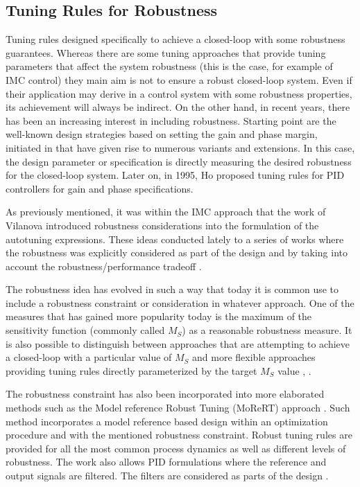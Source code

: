 \subsection{Tuning Rules for Robustness}

Tuning rules designed specifically to achieve a closed-loop with some robustness guarantees. Whereas there are some tuning approaches that provide tuning parameters that  affect the system robustness (this is the case, for example of IMC control) they main aim is not to ensure a robust closed-loop system. Even if their application may derive in a control system with some robustness properties, its achievement will always be indirect. On the other hand, in recent years, there has been an increasing interest in including robustness. Starting point are the well-known design strategies based on setting the gain and phase margin, initiated in \cite{astromhagglun84} that have given rise to numerous variants and extensions. In this case, the design parameter or specification is directly measuring the desired robustness for the closed-loop system. Later on, in 1995, Ho \cite{hoetal95} proposed tuning rules for PID controllers for gain and phase specifications.

As previously mentioned, it was within the IMC approach that the work of Vilanova \cite{vilanovaJPC2008} introduced robustness considerations into the formulation of the autotuning  expressions. These ideas conducted lately to a series of works \cite{alcantara2010, alcantara2013} where the robustness was explicitly considered as part of the design and by taking into account the robustness/performance tradeoff \cite{alfaroajoc12}.

The robustness idea has evolved in such a way that today it is common use to include a robustness constraint or consideration in whatever approach. One of the measures that has gained more popularity today is the maximum of the sensitivity function (commonly called $M_S$) as a reasonable robustness measure. It is also possible to distinguish between approaches that are attempting to achieve a closed-loop with a particular value of $M_S$ and more flexible approaches providing tuning rules directly parameterized by the target $M_S$ value \cite{arrieta2012}, \cite{vilanova2012}. 

The robustness constraint has also been incorporated into more elaborated  methods such as the Model reference Robust Tuning (MoReRT) approach \cite{alfarojopc22}. Such method incorporates a model reference based design within an optimization procedure and with the mentioned robustness constraint. Robust tuning rules are provided for all the most common process dynamics as well as different levels of robustness. The work also allows PID formulations where the reference and output signals are filtered. The filters are considered as parts of the design \cite{alfaroiechr2013}.




